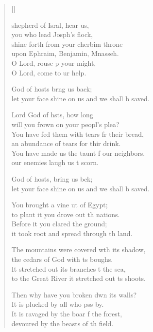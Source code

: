 \settowidth{\versewidth}{let your face shine on us and we shall be saved.}
\begin{verse}[\versewidth]%
  \begin{patverse}
 shepherd of Isral, hear us,\Med\\
you who lead Josph’s flock,\\
shine forth from your cherbim throne\Med\\
upon Ephraim, Benjamin, Mnasseh.\\
O Lord, rouse p your might,\Med\\
O Lord, come to ur help.

God of hosts br\pointup{\i}ng us back;\Med\\
let your face shine on us and we shall b saved.

Lord God of hsts, how long\Med\\
will you frown on your peopl’s plea?\\
You have fed them with tears fr their bread,\Med\\
an abundance of tears for thir drink.\\
You have made us the taunt f our neighbors,\Med\\
our enemies laugh us t scorn.

God of hosts, bring us bck;\Med\\
let your face shine on us and we shall b saved.

You brought a vine ut of Egypt;\Med\\
to plant it you drove out th nations.\\
Before it you clared the ground;\Med\\
it took root and spread through th land.

The mountains were covered w\pointup{\i}th its shadow,\Med\\
the cedars of God with \pointup{\i}ts boughs.\\
It stretched out its branches t the sea,\Med\\
to the Great River it stretched out \pointup{\i}ts shoots.

Then why have you broken dwn its walls?\Med\\
It is plucked by all who pss by.\\
It is ravaged by the boar f the forest,\Med\\
devoured by the beasts of th field.


\end{patverse}
\end{verse}
